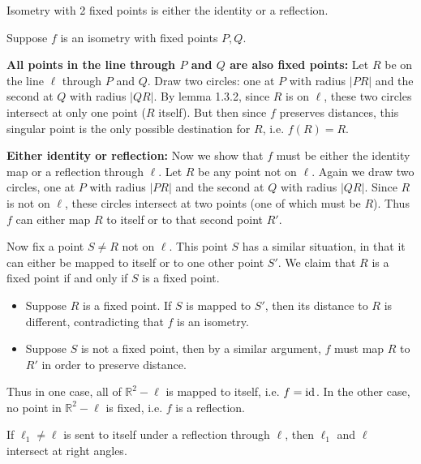 \documentclass[twoside,10pt]{article}
\begin{document}
\newpage

\begin{exer}[1.15]
	Isometry with 2 fixed points is either the identity or a reflection.
\end{exer}

Suppose $f$ is an isometry with fixed points $P,Q$.

\textbf{All points in the line through $P$ and $Q$ are also fixed points:} Let $R$ be on the line $\ell$ through $P$ and $Q$. Draw two circles: one at $P$ with radius $|PR|$ and the second at $Q$ with radius $|QR|$. By lemma 1.3.2, since $R$ is on $\ell$, these two circles intersect at only one point ($R$ itself). But then since $f$ preserves distances, this singular point is the only possible destination for $R$, i.e. $f(R) = R$.

\textbf{Either identity or reflection:} Now we show that $f$ must be either the identity map or a reflection through $\ell$. Let $R$ be any point not on $\ell$. Again we draw two circles, one at $P$ with radius $|PR|$ and the second at $Q$ with radius $|QR|$. Since $R$ is not on $\ell$, these circles intersect at two points (one of which must be $R$). Thus $f$ can either map $R$ to itself or to that second point $R'$.

Now fix a point $S \neq R$ not on $\ell$. This point $S$ has a similar situation, in that it can either be mapped to itself or to one other point $S'$. We claim that $R$ is a fixed point if and only if $S$ is a fixed point.

\begin{itemize}
	\item Suppose $R$ is a fixed point. If $S$ is mapped to $S'$, then its distance to $R$ is different, contradicting that $f$ is an isometry.

	\item Suppose $S$ is not a fixed point, then by a similar argument, $f$ must map $R$ to $R'$ in order to preserve distance.
\end{itemize}

Thus in one case, all of $\mathbb{R}^2-\ell$ is mapped to itself, i.e. $f=\operatorname{id}_{}$. In the other case, no point in $\mathbb{R}^2-\ell$ is fixed, i.e. $f$ is a reflection.

\newpage

\begin{exer}[1.17]
	If $\ell_1\neq \ell$ is sent to itself under a reflection through $\ell$, then $\ell_1$ and $\ell$ intersect at right angles.
\end{exer}
\end{document}

